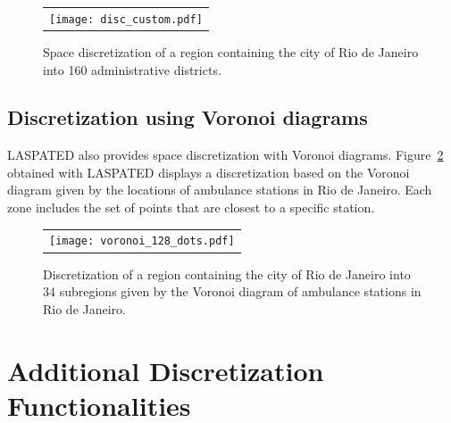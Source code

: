 \documentclass[article]{jss}
\begin{document}
\begin{figure}
\centering
\begin{tabular}{c}
\texttt{[image: disc\_custom.pdf]}
\end{tabular}
\caption{\label{fig:figuredistrict}
Space discretization of a region containing the city of Rio de Janeiro into 160 administrative districts.\label{distfig}}
\end{figure}


\subsection{Discretization using Voronoi diagrams}

LASPATED also provides space discretization with Voronoi diagrams. Figure~\ref{figurevoronoi} obtained with LASPATED displays a discretization based on the Voronoi diagram given by the locations of ambulance stations in Rio de Janeiro.
Each zone includes the set of points that are closest to a specific station.

\begin{figure}
\centering
\begin{tabular}{c}
\texttt{[image: voronoi\_128\_dots.pdf]}
\end{tabular}
\caption{\label{figurevoronoi} Discretization of a region containing the city of Rio de Janeiro into 34 subregions given by the Voronoi diagram of ambulance stations in Rio de Janeiro.}
\end{figure}


\section{Additional Discretization Functionalities}
\label{sec:adddisc}
\end{document}
